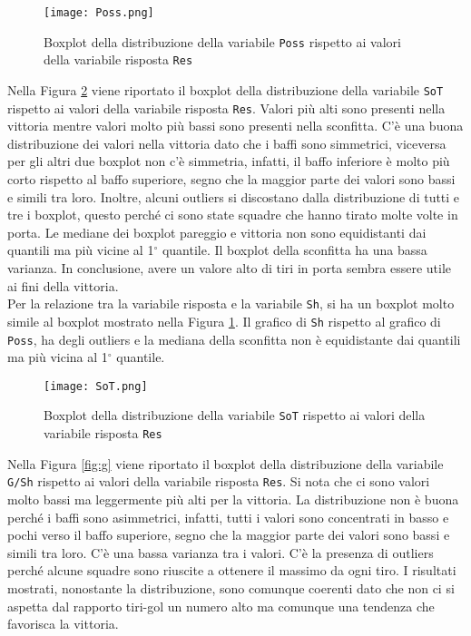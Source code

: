 \begin{figure}[htbp]
	\begin{center}
		\texttt{[image: Poss.png]}
		\caption{Boxplot della distribuzione della variabile \texttt{Poss} rispetto ai valori della variabile risposta \texttt{Res}} \label{fig:Poss}
	\end{center}
\end{figure}

Nella Figura \ref{fig:sot} viene riportato il boxplot della distribuzione della variabile \texttt{SoT} rispetto ai valori della variabile risposta \texttt{Res}. Valori più alti sono presenti nella vittoria mentre valori molto più bassi sono presenti nella sconfitta. C'è una buona distribuzione dei valori nella vittoria dato che i baffi sono simmetrici, viceversa per gli altri due boxplot non c'è simmetria, infatti, il baffo inferiore è molto più corto rispetto al baffo superiore, segno che la maggior parte dei valori sono bassi e simili tra loro. Inoltre, alcuni outliers si discostano dalla distribuzione di tutti e tre i boxplot, questo perché ci sono state squadre che hanno tirato molte volte in porta. Le mediane dei boxplot pareggio e vittoria non sono equidistanti dai quantili ma più vicine al 1$^{\circ}$ quantile. Il boxplot della sconfitta ha una bassa varianza. In conclusione, avere un valore alto di tiri in porta sembra essere utile ai fini della vittoria.\\

Per la relazione tra la variabile risposta e la variabile \texttt{Sh}, si ha un boxplot molto simile al boxplot mostrato nella Figura \ref{fig:Poss}. Il grafico di \texttt{Sh} rispetto al grafico di \texttt{Poss}, ha degli outliers e la mediana della sconfitta non è equidistante dai quantili ma più vicina al 1$^{\circ}$ quantile.\\

\begin{figure}[htbp]
	\begin{center}
		\texttt{[image: SoT.png]}
		\caption{Boxplot della distribuzione della variabile \texttt{SoT} rispetto ai valori della variabile risposta \texttt{Res} } \label{fig:sot}
	\end{center}
\end{figure}

Nella Figura \ref{fig:g} viene riportato il boxplot della distribuzione della variabile \texttt{G/Sh} rispetto ai valori della variabile risposta \texttt{Res}. Si nota che ci sono valori molto bassi ma leggermente più alti per la vittoria. La distribuzione non è buona perché i baffi sono asimmetrici, infatti, tutti i valori sono concentrati in basso e pochi verso il baffo superiore, segno che la maggior parte dei valori sono bassi e simili tra loro. C'è una bassa varianza tra i valori. C'è la presenza di outliers perché alcune squadre sono riuscite a ottenere il massimo da ogni tiro. I risultati mostrati, nonostante la distribuzione, sono comunque coerenti dato che non ci si aspetta dal rapporto tiri-gol un numero alto ma comunque una tendenza che favorisca la vittoria.\\


